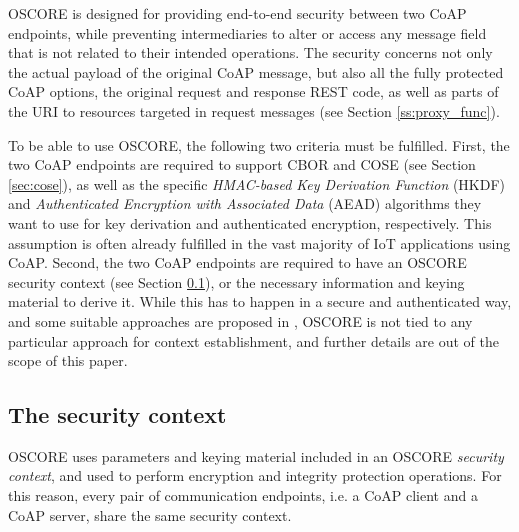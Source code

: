 {OSCORE is designed for providing end-to-end security between two CoAP endpoints, while preventing intermediaries to alter or access any message field that is not related to their intended operations. The security concerns not only the actual payload of the original CoAP message, but also all the fully protected CoAP options, the original request and response REST code, as well as parts of the URI to resources targeted in request messages (see Section \ref{ss:proxy_func}). 

To be able to use OSCORE, the following two criteria must be fulfilled. First, the two CoAP endpoints are required to support CBOR and COSE (see Section \ref{sec:cose}), as well as the specific \emph{HMAC-based Key Derivation Function} (HKDF) and \emph{Authenticated Encryption with Associated Data} (AEAD) algorithms they want to use for key derivation and authenticated encryption, respectively. This assumption is often already fulfilled in the vast majority of IoT applications using CoAP. Second, the two CoAP endpoints are required to have an OSCORE security context (see Section \ref{sec:con}), or the necessary information and keying material to derive it. While this has to happen in a secure and authenticated way, and some suitable approaches are proposed in \cite{cite:coseecdh}\cite{cite:oscoreprofile}, OSCORE is not tied to any particular approach for context establishment, and further details are out of the scope of this paper.

\subsection{The security context}
\label{sec:con}
OSCORE uses parameters and keying material included in an OSCORE \emph{security context}, and used to perform encryption and integrity protection operations. For this reason, every pair of communication endpoints, i.e. a CoAP client and a CoAP server, share the same security context.

}
